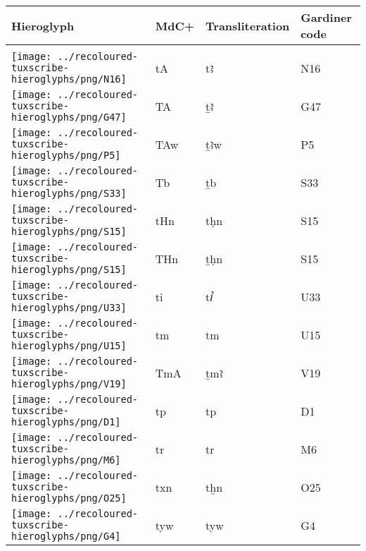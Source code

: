 \begin{center}
	\begin{tabularx}{\linewidth}{YYYY}
		Hieroglyph & MdC+ & Transliteration & Gardiner code\\
		\hline\\
		\texttt{[image: ../recoloured-tuxscribe-hieroglyphs/png/N16]} & tA & tꜣ & N16 \\ 
		\texttt{[image: ../recoloured-tuxscribe-hieroglyphs/png/G47]} & TA & ṯꜣ & G47 \\ 
		\texttt{[image: ../recoloured-tuxscribe-hieroglyphs/png/P5]} & TAw & ṯꜣw & P5 \\ 
		\texttt{[image: ../recoloured-tuxscribe-hieroglyphs/png/S33]} & Tb & ṯb & S33 \\ 
		\texttt{[image: ../recoloured-tuxscribe-hieroglyphs/png/S15]} & tHn & tḥn & S15 \\ 
		\texttt{[image: ../recoloured-tuxscribe-hieroglyphs/png/S15]} & THn & ṯḥn & S15 \\ 
		\texttt{[image: ../recoloured-tuxscribe-hieroglyphs/png/U33]} & ti & tꞽ & U33 \\ 
		\texttt{[image: ../recoloured-tuxscribe-hieroglyphs/png/U15]} & tm & tm & U15 \\ 
		\texttt{[image: ../recoloured-tuxscribe-hieroglyphs/png/V19]} & TmA & ṯmꜣ & V19 \\ 
		\texttt{[image: ../recoloured-tuxscribe-hieroglyphs/png/D1]} & tp & tp & D1 \\ 
		\texttt{[image: ../recoloured-tuxscribe-hieroglyphs/png/M6]} & tr & tr & M6 \\ 
		\texttt{[image: ../recoloured-tuxscribe-hieroglyphs/png/O25]} & txn & tḫn & O25 \\ 
		\texttt{[image: ../recoloured-tuxscribe-hieroglyphs/png/G4]} & tyw & tyw & G4 \\ 
	\end{tabularx}
\end{center}



